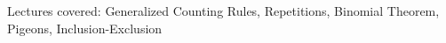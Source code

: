 \documentclass[handout]{mcs}
\begin{document}
\renewcommand{\reading}{
  Chapter~\bref{generalized_product_sec}.\ \emph{The Generalized Product
    Rule} through~\bref{inc-ex_sec}.\ \emph{Inclusion-Exclusion}}


\begin{staffnotes}
  Lectures covered: Generalized Counting Rules, Repetitions, Binomial
  Theorem, Pigeons, Inclusion-Exclusion
\end{staffnotes}






\end{document}
